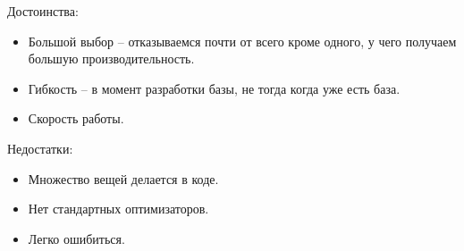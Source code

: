Достоинства:
\begin{itemize}
	\item Большой выбор -- отказываемся почти от всего кроме одного, у чего получаем большую
	      производительность.
	\item Гибкость -- в момент разработки базы, не тогда когда уже есть база.
	\item Скорость работы.
\end{itemize}

Недостатки:
\begin{itemize}
	\item Множество вещей делается в коде.
	\item Нет стандартных оптимизаторов.
	\item Легко ошибиться.
\end{itemize}
